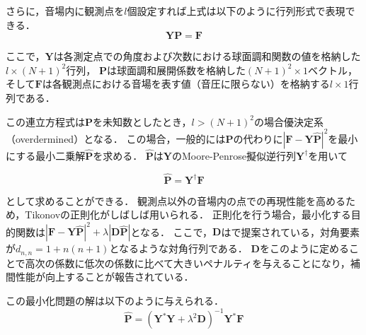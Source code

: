\documentclass[a4paper]{jsarticle}
\begin{document}
さらに，音場内に観測点を$l$個設定すれば上式は以下のように行列形式で表現できる．
$$
    \mathbf{Y P}=\mathbf{F}
$$

ここで，$\mathbf{Y}$は各測定点での角度および次数における球面調和関数の値を格納した$l \times (N+1)^2$行列，
$\mathbf{P}$は球面調和展開係数を格納した$(N+1)^2 \times 1$ベクトル，
そして$\mathbf{F}$は各観測点における音場を表す値（音圧に限らない）を格納する$l \times 1$行列である．

この連立方程式は$\mathbf{P}$を未知数としたとき，$l > (N+1)^2$の場合優決定系（overdermined）となる．
この場合，一般的には$\mathbf{P}$の代わりに$|\mathbf{F} - \mathbf{Y}\hat{\mathbf{P}}|^2$を最小にする最小二乗解$\hat{\mathbf{P}}$を求める．
$\hat{\mathbf{P}}$は$\mathbf{Y}$のMoore-Penrose擬似逆行列$\mathbf{Y}^\dagger$を用いて

$$
    \hat{\boldsymbol{P}}=\boldsymbol{Y}^{\dagger} \boldsymbol{F}
$$

として求めることができる．
観測点以外の音場内の点での再現性能を高めるため，Tikonovの正則化がしばしば用いられる．
正則化を行う場合，最小化する目的関数は$|\boldsymbol{F}-\boldsymbol{Y} \hat{\boldsymbol{P}}|^{2}+\lambda|\boldsymbol{D} \hat{\boldsymbol{P}}|$となる．
ここで，$\mathbf{D}$は\cite{Duraiswaini2004-fy}で提案されている，対角要素が$d_{n, n} = 1 + n(n+1)$となるような対角行列である．
$\mathbf{D}$をこのように定めることで高次の係数に低次の係数に比べて大きいペナルティを与えることになり，補間性能が向上することが報告されている\cite{Duraiswaini2004-fy}．

この最小化問題の解は以下のように与えられる．
$$
    \hat{\boldsymbol{P}}=\left(\boldsymbol{Y}^{*} \boldsymbol{Y}+\lambda^{2} \boldsymbol{D}\right)^{-1} \boldsymbol{Y}^{*} \boldsymbol{F}
$$



\end{document}

